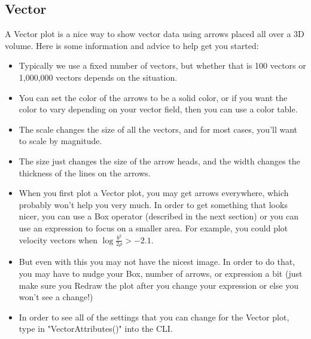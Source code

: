 \documentclass[english]{article}
\begin{document}
    \subsection{Vector}
    A Vector plot is a nice way to show vector data using arrows placed all over a 3D volume. Here is some 
    information and advice to help get you started:
    \begin{itemize}
        \item Typically we use a fixed number of vectors, but whether that is 100 vectors or 1,000,000 vectors depends
              on the situation.
        \item You can set the color of the arrows to be a solid color, or if you want the color to vary depending on
              your vector field, then you can use a color table.
        \item The scale changes the size of all the vectors, and for most cases, you'll want to scale by magnitude.
        \item The size just changes the size of the arrow heads, and the width changes the thickness of the lines on
              the arrows.
        \item When you first plot a Vector plot, you may get arrows everywhere, which probably won't help you very
              much. In order to get something that looks nicer, you can use a Box operator (described in the next
              section) or you can use an expression to focus on a smaller area. For example, you could plot velocity
              vectors when $\log{\frac{b^2}{2\rho}} > -2.1$.
        \item But even with this you may not have the nicest image. In order to do that, you may have to nudge your Box,
              number of arrows, or expression a bit (just make sure you Redraw the plot after you change your expression
              or else you won't see a change!)
        \item In order to see all of the settings that you can change for the Vector plot, type in "VectorAttributes()"
              into the CLI.
    \end{itemize}
\end{document}
